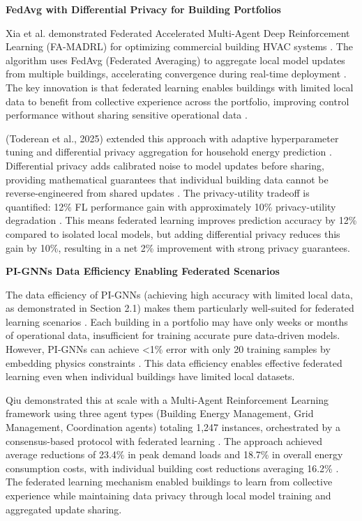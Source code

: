 \documentclass[12pt,a4paper]{article}
\begin{document}
\textbf{FedAvg with Differential Privacy for Building Portfolios}

Xia et al. demonstrated Federated Accelerated Multi-Agent Deep Reinforcement Learning (FA-MADRL) for optimizing commercial building HVAC systems \cite{ref156}. The algorithm uses FedAvg (Federated Averaging) to aggregate local model updates from multiple buildings, accelerating convergence during real-time deployment \cite{ref157}. The key innovation is that federated learning enables buildings with limited local data to benefit from collective experience across the portfolio, improving control performance without sharing sensitive operational data \cite{ref158}.

(Toderean et al., 2025) extended this approach with adaptive hyperparameter tuning and differential privacy aggregation for household energy prediction \cite{ref159}. Differential privacy adds calibrated noise to model updates before sharing, providing mathematical guarantees that individual building data cannot be reverse-engineered from shared updates \cite{ref160}. The privacy-utility tradeoff is quantified: 12\% FL performance gain with approximately 10\% privacy-utility degradation \cite{ref161}. This means federated learning improves prediction accuracy by 12\% compared to isolated local models, but adding differential privacy reduces this gain by 10\%, resulting in a net 2\% improvement with strong privacy guarantees.

\textbf{PI-GNNs Data Efficiency Enabling Federated Scenarios}

The data efficiency of PI-GNNs (achieving high accuracy with limited local data, as demonstrated in Section 2.1) makes them particularly well-suited for federated learning scenarios \cite{ref162}. Each building in a portfolio may have only weeks or months of operational data, insufficient for training accurate pure data-driven models. However, PI-GNNs can achieve <1\% error with only 20 training samples by embedding physics constraints \cite{ref163}. This data efficiency enables effective federated learning even when individual buildings have limited local datasets.

Qiu demonstrated this at scale with a Multi-Agent Reinforcement Learning framework using three agent types (Building Energy Management, Grid Management, Coordination agents) totaling 1,247 instances, orchestrated by a consensus-based protocol with federated learning \cite{ref164}. The approach achieved average reductions of 23.4\% in peak demand loads and 18.7\% in overall energy consumption costs, with individual building cost reductions averaging 16.2\% \cite{ref165}. The federated learning mechanism enabled buildings to learn from collective experience while maintaining data privacy through local model training and aggregated update sharing.
\end{document}
